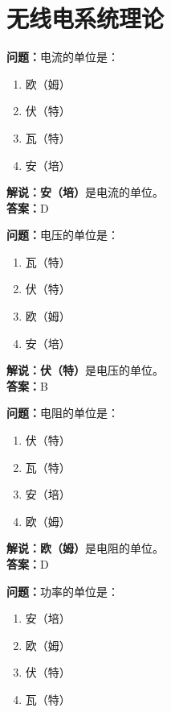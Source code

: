 \chapter{无线电系统理论}


\textbf{问题：}电流的单位是：

\begin{enumerate}[label=\Alph*), leftmargin=1cm]
	\item 欧（姆）
	\item 伏（特）
	\item 瓦（特）
	\item 安（培）
\end{enumerate}

\textbf{解说：}\textbf{安（培）}是电流的单位。\\\textbf{答案：}D



\textbf{问题：}电压的单位是：

\begin{enumerate}[label=\Alph*), leftmargin=1cm]
	\item 瓦（特）
	\item 伏（特）
	\item 欧（姆）
	\item 安（培）
\end{enumerate}

\textbf{解说：伏（特）}是电压的单位。\\\textbf{答案：}B



\textbf{问题：}电阻的单位是：

\begin{enumerate}[label=\Alph*), leftmargin=1cm]
	\item 伏（特）
	\item 瓦（特）
	\item 安（培）
	\item 欧（姆）
\end{enumerate}

\textbf{解说：欧（姆）}是电阻的单位。\\\textbf{答案：}D



\textbf{问题：}功率的单位是：

\begin{enumerate}[label=\Alph*), leftmargin=1cm]
	\item 安（培）
	\item 欧（姆）
	\item 伏（特）
	\item 瓦（特）
\end{enumerate}


